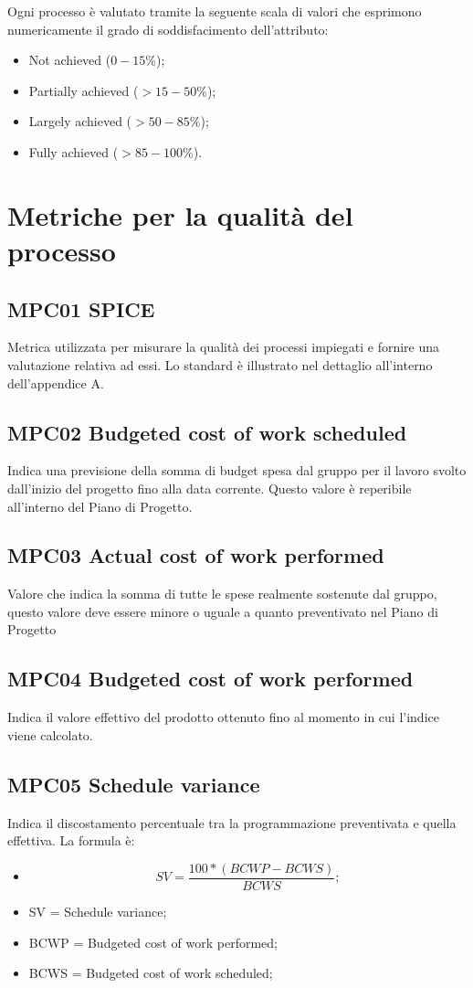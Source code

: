 Ogni processo è valutato tramite la seguente scala di valori che esprimono numericamente il grado di soddisfacimento dell’attributo:
\begin{itemize}
  \item Not achieved (\(0-15\%\));
  \item Partially achieved (\(>15-50\%\));
  \item Largely achieved (\(>50-85\%\));
  \item Fully achieved (\(>85-100\%\)). 
\end{itemize}

\pagebreak

\section{Metriche per la qualità del processo}
\subsection{MPC01 SPICE}
Metrica utilizzata per misurare la qualità dei processi impiegati e fornire una valutazione relativa ad essi. Lo standard è illustrato nel dettaglio all’interno dell'appendice A.

\subsection{MPC02 Budgeted cost of work scheduled}
Indica una previsione della somma di budget spesa dal gruppo per il lavoro svolto dall’inizio del progetto fino alla data corrente. Questo valore è reperibile all’interno del Piano di Progetto.

\subsection{MPC03 Actual cost of work performed}
Valore che indica la somma di tutte le spese realmente sostenute dal gruppo, questo valore deve essere minore o uguale a quanto preventivato nel Piano di Progetto

\subsection{MPC04 Budgeted cost of work performed}
Indica il valore effettivo del prodotto ottenuto fino al momento in cui l’indice viene calcolato.

\subsection{MPC05 Schedule variance}
Indica il discostamento percentuale tra la programmazione preventivata e quella effettiva.
La formula è:
\begin{itemize}
  \item[] \[SV =  \frac{100 * (BCWP - BCWS)}{BCWS};\]
  \item SV = Schedule variance;
  \item BCWP = Budgeted cost of work performed;
  \item BCWS = Budgeted cost of work scheduled;
\end{itemize}

